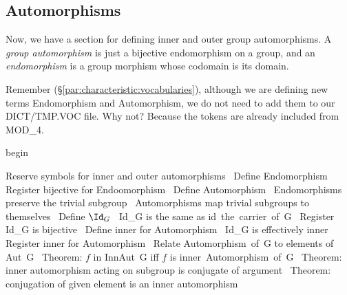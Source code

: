 \subsection{Automorphisms}%

\M Now, we have a section for defining inner and outer group
automorphisms. A \emph{group automorphism} is just a bijective endomorphism on
a group, and an \emph{endomorphism} is a group morphism whose codomain
is its domain.

Remember (\S\ref{par:characteristic:vocabularies}), although we are
defining new terms {\Tt{}Endomorphism\nwendquote} and {\Tt{}Automorphism\nwendquote}, we do not need
to add them to our {\Tt{}DICT/TMP.VOC\nwendquote} file. Why not? Because the tokens
are already included from {\Tt{}MOD{\_}4\nwendquote}.

\nwenddocs{}\endmoddef\nwstartdeflinemarkup\nwenddeflinemarkup
begin

\LA{}Reserve symbols for inner and outer automorphisms~{\nwtagstyle{}}\RA{}
\LA{}Define \code{}Endomorphism\edoc{}~{\nwtagstyle{}}\RA{}
\LA{}Register \code{}bijective\edoc{} for \code{}Endoomorphism\edoc{}~{\nwtagstyle{}}\RA{}
\LA{}Define \code{}Automorphism\edoc{}~{\nwtagstyle{}}\RA{}
\LA{}Endomorphisms preserve the trivial subgroup~{\nwtagstyle{}}\RA{}
\LA{}Automorphisms map trivial subgroups to themselves~{\nwtagstyle{}}\RA{}
\LA{}Define $\Id_{G}$~{\nwtagstyle{}}\RA{}
\LA{}\code{}Id{\_}G\edoc{} is the same as \code{}id\ the\ carrier\ of\ G\edoc{}~{\nwtagstyle{}}\RA{}
\LA{}Register \code{}Id{\_}G\edoc{} is bijective~{\nwtagstyle{}}\RA{}
\LA{}Define \code{}inner\edoc{} for Automorphism~{\nwtagstyle{}}\RA{}
\LA{}\code{}Id{\_}G\edoc{} is effectively inner~{\nwtagstyle{}}\RA{}
\LA{}Register \code{}inner\edoc{} for \code{}Automorphism\edoc{}~{\nwtagstyle{}}\RA{}
\LA{}Relate \code{}Automorphism\ of\ G\edoc{} to elements of \code{}Aut\ G\edoc{}~{\nwtagstyle{}}\RA{}
\LA{}Theorem: $f$ in \code{}InnAut\ G\edoc{} iff $f$ is \code{}inner\ Automorphism\ of\ G\edoc{}~{\nwtagstyle{}}\RA{}
\LA{}Theorem: inner automorphism acting on subgroup is conjugate of argument~{\nwtagstyle{}}\RA{}
\LA{}Theorem: conjugation of given element is an inner automorphism~{\nwtagstyle{}}\RA{}

